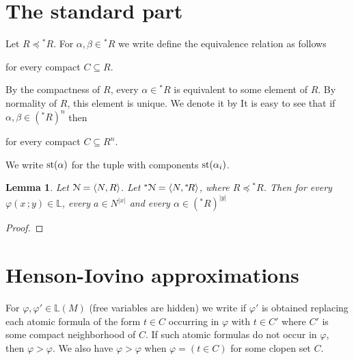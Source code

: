 \documentclass[11pt,oneside]{amsart}
\theoremstyle{plain}
\newtheorem{lemma}[theorem]{Lemma}
\theoremstyle{remark}
\renewcommand*{\emph}[1]{%
   \smash{\tikz[baseline]\node[rectangle, fill=olive!25, rounded corners, inner xsep=0.5ex, inner ysep=0.2ex, anchor=base, minimum height = 2.7ex]{#1};}}
\begin{document}
\section{The standard part}
Let $R\preceq{}^*\!R$.
For $\alpha,\beta\in{}^*\!R$ we write define the equivalence relation \emph{$\alpha\sim\beta$\/} as follows

\quad for every compact $C\subseteq R$.

By the compactness of $R$, every $\alpha\in{}^*\!R$ is equivalent to some element of $R$.
By normality of $R$, this element is unique.
We denote it by \emph{${\rm st}(\alpha)$.}
It is easy to see that if $\alpha,\beta\in({}^*\!R)^n$ then 

\quad for every compact $C\subseteq R^n$.

We write ${\rm st}(\alpha)$ for the tuple with components ${\rm st}(\alpha_i)$. 

\begin{lemma}
  Let ${\EuScript N}=\langle N,R\rangle$.
  Let ${}^*{\EuScript N}=\langle N,{}^*\!R\rangle$, where $R\preceq{}^*\!R$.
  Then for every $\varphi(x\,;y)\in\mathds{L}$, every $a\in N^{|x|}$ and every $\alpha\in({}^*\!R)^{|y|}$ 


\end{lemma}

\begin{proof}
  
\end{proof}






\section{Henson-Iovino approximations}\label{ultrapws}


For $\varphi,\varphi'\in\mathds{L}(M)$ (free variables are hidden) we write \emph{$\varphi'>\varphi$\/} if $\varphi'$ is obtained replacing each atomic formula of the form $t\in C$ occurring in $\varphi$ with $t\in C'$ where $C'$ is some compact neighborhood of $C$.
If such atomic formulas do not occur in $\varphi$, then $\varphi>\varphi$.
We also have $\varphi>\varphi$ when $\varphi=(t\in C)$ for some clopen set $C$.
\end{document}
